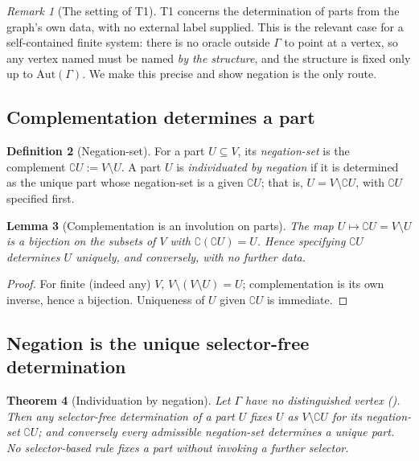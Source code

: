 \documentclass[11pt,a4paper]{article}
\theoremstyle{thmstyle}
\newtheorem{theorem}{Theorem}[section]
\newtheorem{lemma}[theorem]{Lemma}
\theoremstyle{definition}
\newtheorem{definition}[theorem]{Definition}
\theoremstyle{remark}
\newtheorem{remark}[theorem]{Remark}
\newcommand{\Gph}{\Gamma}                 %
\newcommand{\V}{V}                        %
\newcommand{\co}{\complement}             %
\begin{document}
\begin{remark}[The setting of T1]
\label{rem:nodist}
T1 concerns the determination of parts from the graph's own data, with no
external label supplied. This is the relevant case for a self-contained finite
system: there is no oracle outside $\Gph$ to point at a vertex, so any vertex
named must be named \emph{by the structure}, and the structure is fixed only up
to $\mathrm{Aut}(\Gph)$. We make this precise and show negation is the only
route.
\end{remark}

\subsection{Complementation determines a part}

\begin{definition}[Negation-set]
\label{def:negationset}
For a part $U\subseteq\V$, its \emph{negation-set} is the complement
$\co U:=\V\setminus U$. A part $U$ is \emph{individuated by negation} if it is
determined as the unique part whose negation-set is a given $\co U$; that is,
$U=\V\setminus\co U$, with $\co U$ specified first.
\end{definition}

\begin{lemma}[Complementation is an involution on parts]
\label{lem:involution}
The map $U\mapsto\co U=\V\setminus U$ is a bijection on the subsets of $\V$ with
$\co{(\co U)}=U$. Hence specifying $\co U$ determines $U$ uniquely, and
conversely, with no further data.
\end{lemma}

\begin{proof}
For finite (indeed any) $\V$, $\V\setminus(\V\setminus U)=U$; complementation is
its own inverse, hence a bijection. Uniqueness of $U$ given $\co U$ is immediate.
\end{proof}

\subsection{Negation is the unique selector-free determination}

\begin{theorem}[Individuation by negation]
\label{thm:negation}
Let $\Gph$ have no distinguished vertex \textup{(}\textup{)}.
Then any selector-free determination of a part $U$ fixes $U$ as
$\V\setminus\co U$ for its negation-set $\co U$; and conversely every admissible
negation-set determines a unique part. No selector-based rule fixes a part
without invoking a further selector.
\end{theorem}
\end{document}

